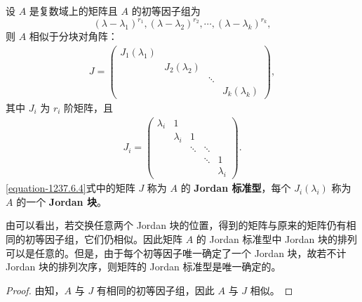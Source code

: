 \documentclass[../../main.tex]{subfiles}%
\begin{document}
\begin{theorem}[Jordan标准型]\label{theorem:Jordan标准型}
设 $A$ 是复数域上的矩阵且 $A$ 的初等因子组为
\[
(\lambda - \lambda_1)^{r_1}, (\lambda - \lambda_2)^{r_2}, \cdots, (\lambda - \lambda_k)^{r_k},
\]
则 $A$ 相似于分块对角阵：
\begin{align}
J = \begin{pmatrix}
J_1(\lambda_1) & & & \\
& J_2(\lambda_2) & & \\
& & \ddots & \\
& & & J_k(\lambda_k)
\end{pmatrix},
\label{equation-1237.6.4}
\end{align}
其中 $J_i$ 为 $r_i$ 阶矩阵，且
\begin{align*}
J_i = \begin{pmatrix}
\lambda_i & 1 & & & \\
& \lambda_i & 1 & & \\
& & \ddots & \ddots & \\
& & & \ddots & 1 \\
& & & & \lambda_i
\end{pmatrix}.
\end{align*}
\eqref{equation-1237.6.4}式中的矩阵 $J$ 称为 $A$ 的\textbf{ Jordan 标准型}，每个 $J_i(\lambda_i)$ 称为 $A$ 的一个 \textbf{ Jordan 块}。 
\end{theorem}
\begin{remark}
由可以看出，若交换任意两个 Jordan 块的位置，得到的矩阵与原来的矩阵仍有相同的初等因子组，它们仍相似。因此矩阵 $A$ 的 Jordan 标准型中 Jordan 块的排列可以是任意的。但是，由于每个初等因子唯一确定了一个 Jordan 块，故若不计 Jordan 块的排列次序，则矩阵的 Jordan 标准型是唯一确定的。 
\end{remark}
\begin{proof}

由知，$A$ 与 $J$ 有相同的初等因子组，因此 $A$ 与 $J$ 相似。

\end{proof}
\end{document}
